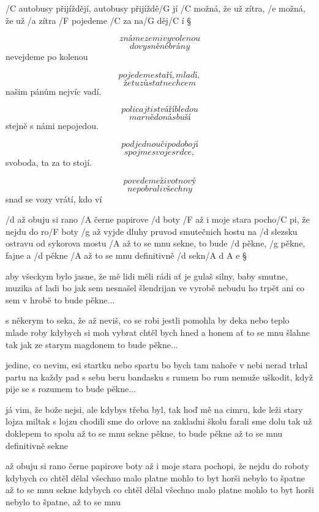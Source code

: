 




/C autobusy přijíždějí, autobusy přijíždě/G jí
/C možná, že už zítra, /e možná, že už /a zítra
/F pojedeme /C za na/G děj/C í \S

\[ známe zemi vyvolenou \]
\[ do vysněné brány \]
nevejdeme po kolenou \s

\[ pojedeme staří, mladí, \]
\[ že tu zůstat nechcem \]
našim pánům nejvíc vadí. \s

\[ policajti s tváří bledou \]
\[ marně do nás buší \]
stejně s námi nepojedou. \s

\[ pod jednou či podobojí \]
\[ spojme svoje srdce, \]
svoboda, ta za to stojí. \s

\[ povedeme život nový \]
\[ nepobrali všechny \]
snad se vozy vrátí, kdo ví \s




/d až obuju si rano /A černe papirove /d boty
/F až i moje stara pocho/C pi, že nejdu do ro/F boty
/g až vyjde dluhy pruvod smutečnich hostu
na /d slezsku ostravu od sykorova mostu
/A až to se mnu sekne, to bude /d pěkne, /g pěkne, fajne a /d pěkne
/A až to se mnu definitivně /d sekn/{A d A} e \S

aby všeckym bylo jasne, že mě lidi měli rádi
ať je gulaš silny, baby smutne, muzika ať ladi
bo jak sem nesnašel šlendrijan ve vyrobě
nebudu ho trpět ani co sem v hrobě
to bude pěkne... \s

s někerym to seka, že až neviš, co se robi
jestli pomohla by deka nebo teplo mlade roby
kdybych si moh vybrat chtěl bych hned a honem
ať to se mnu šlahne tak jak ze starym magdonem
to bude pěkne... \s

jedine, co nevim, esi startku nebo spartu
bo bych tam nahoře v nebi nerad trhal partu
na každy pad s sebu beru bandasku s rumem
bo rum nemuže uškodit, když pije se s rozumem
to bude pěkne... \s

já vim, že bože nejsi, ale kdybys třeba byl, tak
hoď mě na cimru, kde leži stary lojza miltak
s lojzu chodili sme do orlove na zakladni školu
farali sme dolu tak už doklepem to spolu
až to se mnu sekne pěkne, to bude pěkne
až to se mnu definitivně sekne \s

až obuju si rano černe papirove boty
až i moje stara pochopi, že nejdu do roboty
kdybych co chtěl dělal všechno malo platne
mohlo to byt horši nebylo to špatne až to se mnu sekne
kdybych co chtěl dělal všechno malo platne
mohlo to byt horši nebylo to špatne, až to se mnu \s

